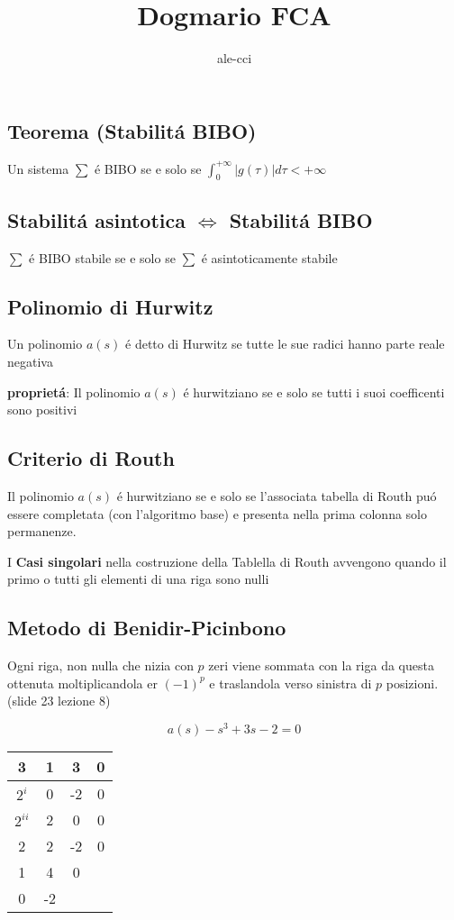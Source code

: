 \documentclass{article}
\title {Dogmario FCA}
\author{ale-cci}
\begin{document}
\subsection{Teorema (Stabilit\'a BIBO)}
Un sistema $\sum$ \'e BIBO se e solo se $\int_0^{+\infty} | g(\tau) | d\tau < + \infty$

\subsection{Stabilit\'a asintotica $\Leftrightarrow$ Stabilit\'a BIBO}
$\sum$ \'e BIBO stabile se e solo se $\sum$ \'e asintoticamente stabile

\subsection{Polinomio di Hurwitz}
Un polinomio $a(s)$ \'e detto di Hurwitz se tutte le sue radici hanno parte reale negativa

\textbf{propriet\'a}: Il polinomio $a(s)$ \'e hurwitziano se e solo se tutti i suoi coefficenti sono positivi

\subsection{Criterio di Routh}
Il polinomio $a(s)$ \'e hurwitziano se e solo se l'associata tabella di Routh pu\'o essere completata (con l'algoritmo base) e presenta nella prima colonna solo permanenze.

I \textbf{Casi singolari} nella costruzione della Tablella di Routh avvengono quando il primo o tutti gli elementi di una riga sono nulli

\subsection{Metodo di Benidir-Picinbono}
Ogni riga, non nulla che nizia con $p$ zeri viene sommata con la riga da questa ottenuta moltiplicandola er $(-1)^p$ e traslandola verso sinistra di $p$ posizioni. (slide 23 lezione 8)

\[ a(s) - s^3 + 3s -2 = 0 \]
\begin{center}
    \begin{tabular} {c|c c c}
        3 & 1 & 3 & 0\\
        \hline
        $2^i$ & 0 & -2 & 0\\
        $2^{ii}$ & 2 & 0 & 0\\
        \hline
        2 & 2 & -2 & 0\\
        1 & 4 & 0\\
        0 & -2
\end{tabular}
\end{center}
\end{document}
